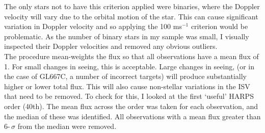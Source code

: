 \begin{figure}
	\hspace{-3cm}
	\captionsetup{width=.5\textwidth}
    \caption{}
    \label{figGL667C_Details}
\end{figure}

The only stars not to have this criterion applied were binaries, where the Doppler velocity will vary due to the orbital motion of the star. This can cause significant variation in Doppler velocity and so applying the 100 ms$^{-1}$ criterion would be problematic. As the number of binary stars in my sample was small, I visually inspected their Doppler velocities and removed any obvious outliers.\\

The procedure mean-weights the flux so that all observations have a mean flux of 1. For small changes in seeing, this is acceptable. Large changes in seeing, (or in the case of GL667C, a number of incorrect targets) will produce substantially higher or lower total flux. This will also cause non-stellar variations in the ISV that need to be removed. To check for this, I looked at the first `useful' HARPS order (40th). The mean flux across the order was taken for each observation, and the median of these was identified. All observations with a mean flux greater than 6-\,$\sigma$ from the median were removed.\\

